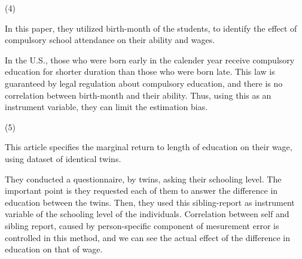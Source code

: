 \documentclass[dvipdfmx]{jsarticle}
\begin{document}
\begin{enumerate}
 (4)
 
 In this paper, they utilized birth-month of the students, to identify the effect of compulsory school attendance on their ability and wages.
 
 In the U.S., those who were born early in the calender year receive compulsory education for shorter duration than those who were born late. This law is guaranteed by legal regulation about compulsory education, and there is no correlation between birth-month and their ability. Thus, using this as an instrument variable, they can limit the estimation bias.
 
 (5)
 
This article specifies the marginal return to length of education on their wage, using dataset of identical twins.

They conducted a questionnaire, by twins, asking their schooling level. The important point is they requested each of them to answer the difference in education between the twins. Then, they used this sibling-report as instrument variable of the schooling level of the individuals. Correlation between self and sibling report, caused by person-specific component of mesurement error is controlled in this method, and we can see the actual effect of the difference in education on that of wage.
 
 \end{enumerate}
\end{document}
